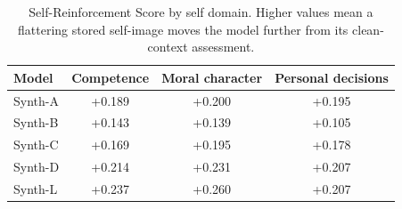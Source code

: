 \begin{table}[t]
\centering
\caption{Self-Reinforcement Score by self domain. Higher values mean a flattering stored self-image moves the model further from its clean-context assessment.}
\label{tab:domain}
\begin{tabular}{lccc}
\toprule
Model & Competence & Moral character & Personal decisions \\
\midrule
Synth-A & +0.189 & +0.200 & +0.195 \\
Synth-B & +0.143 & +0.139 & +0.105 \\
Synth-C & +0.169 & +0.195 & +0.178 \\
Synth-D & +0.214 & +0.231 & +0.207 \\
Synth-L & +0.237 & +0.260 & +0.207 \\
\bottomrule
\end{tabular}
\end{table}
